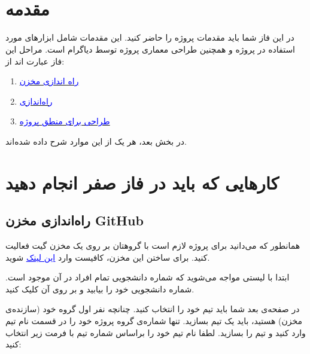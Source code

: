 \documentclass[]{article}
\begin{document}
\KashidaOff


 \Large \textbf{\\\\
}






\section*{{\titr مقدمه}}

در این فاز شما باید مقدمات پروژه را حاضر کنید. این مقدمات شامل ابزارهای مورد استفاده در پروژه و همچنین طراحی معماری پروژه توسط دیاگرام  است. مراحل این فاز عبارت اند از:

\begin{enumerate}

\item
\hyperref[subsec:github]{\textcolor{blue}{راه اندازی مخزن }}

\item
\hyperref[subsec:GitHub Issue]{\textcolor{blue}{راه‌اندازی }}

\item
\hyperref[subsec:uml]{\textcolor{blue}{طراحی  برای منطق پروژه}}


\end{enumerate}

در بخش بعد، هر یک از این موارد شرح داده شده‌اند.

\newpage
\section*{{\titr کارهایی که باید در فاز صفر انجام دهید}}


\subsection*{{\titr راه‌اندازی مخزن GitHub}}
\label{subsec:github}

همانطور که می‌دانید برای پروژه لازم است با گروهتان بر روی یک مخزن  گیت فعالیت کنید. برای ساختن این مخزن، کافیست وارد
 \href{https://classroom.github.com/a/536Wx2Tr}{\textcolor{blue}{\underline{این لینک}}} 
 شوید.

ابتدا با لیستی مواجه می‌شوید که شماره دانشجویی تمام افراد در آن موجود است. شماره دانشجویی خود را بیابید و بر روی آن کلیک کنید.

در صفحه‌ی بعد شما باید تیم خود را انتخاب کنید. چنانچه نفر اول گروه خود (سازنده‌ی مخزن) هستید، باید یک تیم بسازید. تنها شماره‌ی گروه پروژه خود را در قسمت نام تیم وارد کنید و تیم را بسازید. لطفا نام تیم خود را براساس شماره تیم با فرمت زیر انتخاب کنید:
\begin{flushleft}
\end{flushleft}
\end{document}
